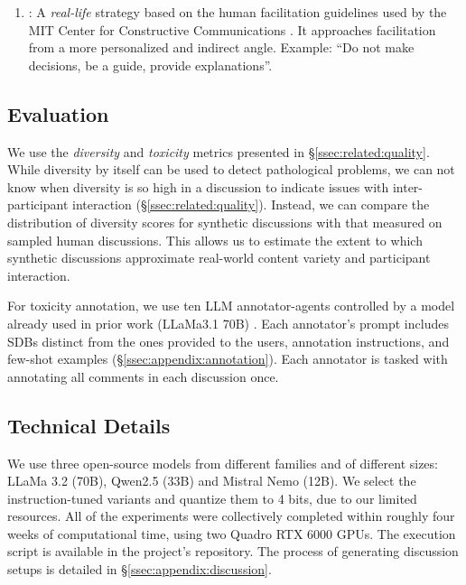 \begin{enumerate}
    \item \textbf{\strategyconstrcomm}: A \emph{real-life} strategy based on the human facilitation guidelines used by the MIT Center for Constructive Communications \cite{dimitra-book}. It approaches facilitation from a more personalized and indirect angle. Example: ``Do not make decisions, be a guide, provide explanations''.
\end{enumerate}


\subsection{Evaluation}
\label{ssec:experimental:evaluation}

 We use the \emph{diversity} and \emph{toxicity} metrics presented in \S\ref{ssec:related:quality}. While diversity by itself can be used to detect pathological problems, we can not know when diversity is so high in a discussion to indicate issues with inter-participant interaction (\S\ref{ssec:related:quality}). Instead, we can compare the distribution of diversity scores for synthetic discussions with that measured on sampled human discussions. This allows us to estimate the extent to which synthetic discussions approximate real-world content variety and participant interaction.
 
 For toxicity annotation, we use ten \ac{LLM} annotator-agents controlled by a model already used in prior work (LLaMa3.1 70B) \cite{kang-qian-2024-implanting}. Each annotator's prompt includes \acp{SDB} distinct from the ones provided to the users, annotation instructions, and few-shot examples (\S\ref{ssec:appendix:annotation}). Each annotator is tasked with annotating all comments in each discussion once.


\subsection{Technical Details}
\label{ssec:experimental:setup}

We use three open-source models from different families and of different sizes: LLaMa 3.2 (70B), Qwen2.5 (33B) and Mistral Nemo (12B). We select the instruction-tuned variants and quantize them to 4 bits, due to our limited resources. All of the experiments were collectively completed within roughly four weeks of computational time, using two Quadro RTX 6000 GPUs. The execution script is available in the project's repository\analysislink. The process of generating discussion setups is detailed in \S\ref{ssec:appendix:discussion}.